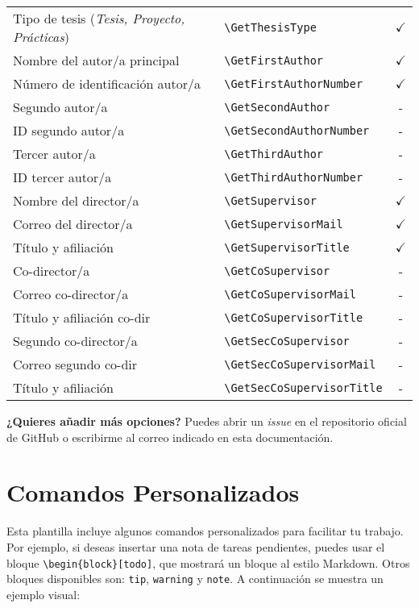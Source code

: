 {\begin{longtable}[c]{llc}
Tipo de tesis (\textit{Tesis, Proyecto, Prácticas}) & \verb|\GetThesisType| & $\checkmark$ \\

Nombre del autor/a principal      & \verb|\GetFirstAuthor|       & $\checkmark$ \\
Número de identificación autor/a & \verb|\GetFirstAuthorNumber| & $\checkmark$ \\ 

Segundo autor/a           & \verb|\GetSecondAuthor|        & - \\
ID segundo autor/a        & \verb|\GetSecondAuthorNumber|  & - \\ 

Tercer autor/a            & \verb|\GetThirdAuthor|         & - \\
ID tercer autor/a         & \verb|\GetThirdAuthorNumber|   & - \\ 

Nombre del director/a     & \verb|\GetSupervisor|          & $\checkmark$ \\
Correo del director/a     & \verb|\GetSupervisorMail|      & $\checkmark$ \\
Título y afiliación       & \verb|\GetSupervisorTitle|     & $\checkmark$ \\ 

Co-director/a             & \verb|\GetCoSupervisor|        & - \\
Correo co-director/a      & \verb|\GetCoSupervisorMail|    & - \\
Título y afiliación co-dir& \verb|\GetCoSupervisorTitle|   & - \\ 

Segundo co-director/a     & \verb|\GetSecCoSupervisor|     & - \\
Correo segundo co-dir     & \verb|\GetSecCoSupervisorMail| & - \\
Título y afiliación       & \verb|\GetSecCoSupervisorTitle|& - \\
\end{longtable}

\textbf{¿Quieres añadir más opciones?} Puedes abrir un \textit{issue} en el repositorio oficial de GitHub o escribirme al correo indicado en esta documentación.

\section{Comandos Personalizados}

Esta plantilla incluye algunos comandos personalizados para facilitar tu trabajo. Por ejemplo, si deseas insertar una nota de tareas pendientes, puedes usar el bloque \verb|\begin{block}[todo]|, que mostrará un bloque al estilo Markdown. Otros bloques disponibles son: \verb|tip|, \verb|warning| y \verb|note|. A continuación se muestra un ejemplo visual:

}
